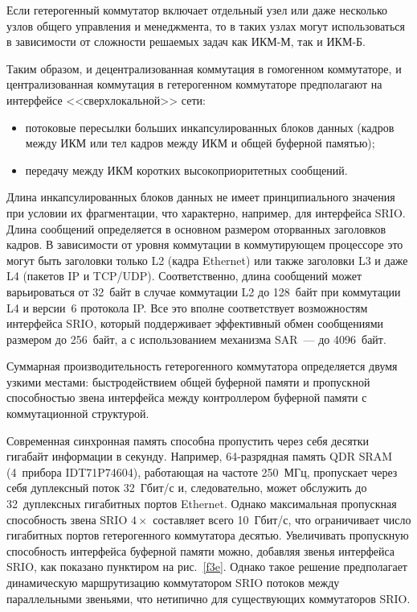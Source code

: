 \begin{multicols}{2}
     Если гетерогенный коммутатор включает отдельный узел или даже несколько узлов 
общего управления и менеджмента, то в таких узлах могут использоваться в зависимости от 
сложности решаемых задач как ИКМ-М, так и ИКМ-Б.
     
     Таким образом, и децентрализованная коммутация в гомогенном коммутаторе, и 
централизованная коммутация в гетерогенном коммутаторе предполагают на интерфейсе 
<<сверхлокальной>> сети:
     \begin{itemize}
\item потоковые пересылки больших инкапсулированных блоков данных (кадров между 
ИКМ или тел кадров между ИКМ и общей буферной памятью);
\item передачу между ИКМ коротких высокоприоритетных сообщений.
\end{itemize}

     Длина инкапсулированных блоков данных не имеет принципиального значения при 
условии их фрагментации, что характерно, например, для интерфейса SRIO. Длина 
сообщений определяется в основном размером оторванных заголовков кадров. В 
зависимости от уровня коммутации в коммутирующем процессоре это могут быть заголовки 
только L2 (кадра Ethernet) или также заголовки L3 и даже L4 (пакетов IP и TCP/UDP). 
Соответственно, длина сообщений может варьироваться от 32~байт в случае коммутации L2 
до 128~байт при коммутации L4 и версии~6 протокола IP. Все это вполне соответствует 
возможностям интерфейса SRIO, который поддерживает эффективный обмен сообщениями 
размером до 256~байт, а с использованием механизма SAR~--- до 4096~байт.
     
     Суммарная производительность гетерогенного коммутатора определяется двумя 
узкими местами: быстродействием общей буферной памяти и пропускной способностью 
звена интерфейса между контроллером буферной памяти с коммутационной структурой. 

Современная синхронная память способна пропустить через себя десятки гигабайт 
информации в секунду. Например, 64-раз\-ряд\-ная память QDR SRAM (4~прибора 
IDT71P74604), работающая на %
частоте 250~МГц, пропускает через себя дуплексный поток 
32~Гбит/с и, следовательно, может обслу\-жить до 32~дуплексных гигабитных портов %
Ethernet. Однако максимальная пропускная способность звена SRIO $4\times$ составляет 
всего 10~Гбит/с, что ограничивает число гигабитных портов гетерогенного коммутатора 
десятью. Увеличивать пропускную способность интерфейса буферной памяти можно, 
добавляя звенья интерфейса SRIO, как показано пунктиром на рис.~\ref{f3e}. Однако такое 
решение предпо\-ла\-га\-ет динамическую маршрутизацию коммутатором SRIO потоков между 
параллельными звеньями, что нетипично для существующих коммутаторов SRIO. 


\end{multicols}
